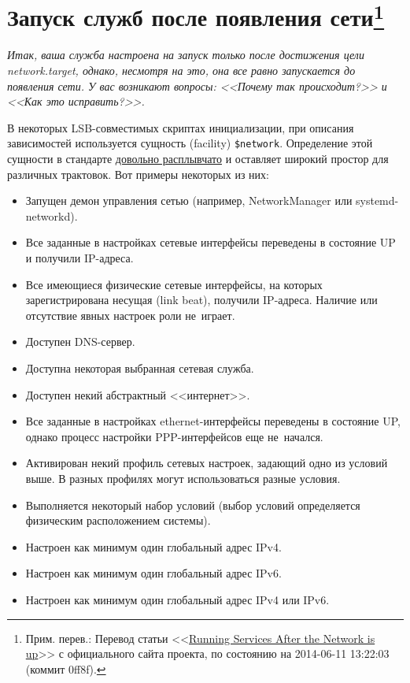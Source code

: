 \documentclass[10pt,oneside,a4paper]{article}
\newcommand{\sfnote}[1]{\texorpdfstring{\protect\footnote%
	{Прим. перев.: #1}}{}}
\newcommand\yousaywtf[1]{\emph{#1}}
\newcommand\yousaywtfsk[1]{\yousaywtf{#1}\medskip\par}
\begin{document}
\section{Запуск служб после появления сети\sfnote{Перевод статьи
<<\href{http://www.freedesktop.org/wiki/Software/systemd/NetworkTarget}{Running
Services After the Network is up}>> с официального сайта проекта, по состоянию
на 2014-06-11 13:22:03 (коммит 0ff8f).}}
\label{sec:networktarget}

\yousaywtfsk{Итак, ваша служба настроена на запуск только после достижения цели
network.target, однако, несмотря на это, она все равно запускается до появления
сети. У вас возникают вопросы: <<Почему так происходит?>> и <<Как это
исправить?>>.}

В некоторых LSB-совместимых скриптах инициализации, при описания зависимостей 
используется сущность (facility) \verb+$network+. Определение этой сущности в 
стандарте
\href{http://refspecs.linuxbase.org/LSB_3.1.1/LSB-Core-generic/LSB-Core-generic/facilname.html}%
{довольно расплывчато} и оставляет широкий простор для различных трактовок. Вот
примеры некоторых из них:
\begin{itemize}
	\item Запущен демон управления сетью (например, NetworkManager или
		systemd-networkd).
	\item Все заданные в настройках сетевые интерфейсы переведены в состояние
		UP и получили IP-адреса.
	\item Все имеющиеся физические сетевые интерфейсы, на которых
		зарегистрирована несущая (link beat), получили IP-адреса.
		Наличие или отсутствие явных настроек роли не~играет.
	\item Доступен DNS-сервер.
	\item Доступна некоторая выбранная сетевая служба.
	\item Доступен некий абстрактный <<интернет>>.
	\item Все заданные в настройках ethernet-интерфейсы переведены в
		состояние UP, однако процесс настройки PPP-интерфейсов еще
		не~начался.
	\item Активирован некий профиль сетевых настроек, задающий одно из
		условий выше. В разных профилях могут использоваться разные
		условия.
	\item Выполняется некоторый набор условий (выбор условий определяется
		физическим расположением системы).
	\item Настроен как минимум один глобальный адрес IPv4.
	\item Настроен как минимум один глобальный адрес IPv6.
	\item Настроен как минимум один глобальный адрес IPv4 или IPv6.
\end{itemize}
\end{document}
